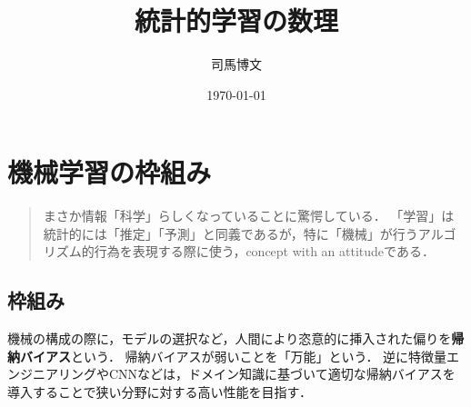 \documentclass[uplatex,dvipdfmx]{jsreport}
\title{統計的学習の数理}
\author{司馬博文}
\date{\today}
\begin{document}
\tableofcontents

\chapter{機械学習の枠組み}

\begin{quotation}
    まさか情報「科学」らしくなっていることに驚愕している．
    「学習」は統計的には「推定」「予測」と同義であるが，特に「機械」が行うアルゴリズム的行為を表現する際に使う，concept with an attitudeである．
\end{quotation}

\section{枠組み}

\begin{tcolorbox}[colframe=ForestGreen, colback=ForestGreen!10!white,breakable,colbacktitle=ForestGreen!40!white,coltitle=black,fonttitle=\bfseries\sffamily,
title=]
    機械の構成の際に，モデルの選択など，人間により恣意的に挿入された偏りを\textbf{帰納バイアス}という．
    帰納バイアスが弱いことを「万能」という．
    逆に特徴量エンジニアリングやCNNなどは，ドメイン知識に基づいて適切な帰納バイアスを導入することで狭い分野に対する高い性能を目指す．
\end{tcolorbox}
\end{document}
